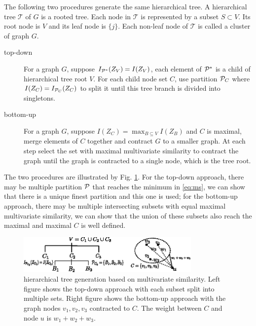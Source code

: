 \documentclass{article}
\begin{document}
\begin{theorem}\label{thm:ta}
The following two procedures generate the same hierarchical tree. A hierarchical tree $\mathcal{T}$ of $G$ is a rooted tree. Each node in $\mathcal{T}$ is represented by a subset $S \subset V$. Its root node is $V$ and its leaf node is $\{j\}$. Each non-leaf node of $\mathcal{T}$ is called a cluster of graph $G$.
\begin{description}
\item[top-down] For a graph $G$, suppose $I_{\P^*}(Z_V)=I(Z_V)$, each element of $\P^*$ is a child of hierarchical tree root $V$. For each child node set $C$, use partition $\P_C$ where $I(Z_C)=I_{\P_C}(Z_C)$ to split it until this tree branch is divided into singletons.
\item[bottom-up] For a graph $G$, suppose $I(Z_C) = \max_{B\subseteq V} I(Z_B)$ and $C$ is maximal, merge elements of $C$ together and contract $G$ to a smaller graph. At each step select the set with maximal multivariate similarity to contract the graph until the graph is contracted to a single node, which is the tree root.
\end{description}
\end{theorem}
The two procedures are illustrated by Fig. \ref{fig:ta}. For the top-down approach, there may be multiple partition $\P$ that reaches the minimum in \eqref{eq:ms}, we can show that there is a unique finest partition and this one is used; for the bottom-up approach, there may be multiple intersecting subsets with equal maximal multivariate similarity, we can show that the union of these subsets also reach the maximal and maximal $C$ is well defined.
\begin{figure}
\centering
\includegraphics[width=0.8\textwidth]{pic/two_approach.eps}
\caption{hierarchical tree generation based on multivariate similarity. Left figure shows the top-down approach with each subset split into multiple sets. Right figure shows the bottom-up approach with the graph nodes $v_1,v_2,v_3$ contracted to $C$. The weight between $C$ and node $u$ is $w_1+w_2+w_3$.}\label{fig:ta}
\end{figure}
\end{document}
